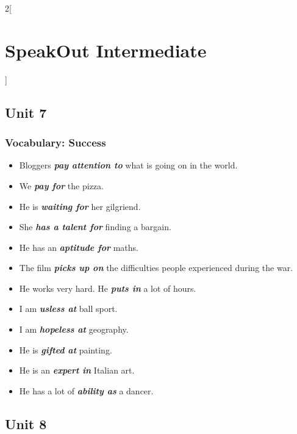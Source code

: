 \documentclass[10pt,a4paper]{article}
\newlength{\OriginalParIndent}
\newcommand\ex[1]{\textit{\textbf{{#1}}}}           %
\newenvironment{ItemizeWithOrigParIndent}
    {\begin{itemize}[leftmargin=\OriginalParIndent]}
    {\end{itemize}}
\begin{document}
\begin{multicols}{2}[\section{SpeakOut Intermediate}]
\subsection{Unit 7}
\subsubsection{Vocabulary: Success}
\begin{ItemizeWithOrigParIndent}
    \item Bloggers \ex{pay attention to} what is going on in the world.
    \item We \ex{pay for} the pizza.
    \item He is \ex{waiting for} her gilgriend.
    \item She \ex{has a talent for} finding a bargain.
    \item He has an \ex{aptitude for} maths.
    \item The film \ex{picks up on} the difficulties people experienced during the war.
    \item He works very hard. He \ex{puts in} a lot of hours.
    \item I am \ex{usless at} ball sport.
    \item I am \ex{hopeless at} geography.
    \item He is \ex{gifted at} painting.
    \item He is an \ex{expert in} Italian art.
    \item He has a lot of \ex{ability as} a dancer.
\end{ItemizeWithOrigParIndent}






\subsection{Unit 8}


\end{multicols}
\end{document}
